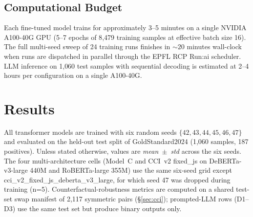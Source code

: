\documentclass[10pt,a4paper]{article}
\newcommand{\dataset}{GoldStandard2024}
\begin{document}
\subsection{Computational Budget}

Each fine-tuned model trains for approximately 3--5 minutes on a single NVIDIA A100-40G GPU (5--7 epochs of 8{,}479 training samples at effective batch size 16). The full multi-seed sweep of 24 training runs finishes in $\sim 20$ minutes wall-clock when runs are dispatched in parallel through the EPFL RCP Run:ai scheduler. LLM inference on 1{,}060 test samples with sequential decoding is estimated at 2--4 hours per configuration on a single A100-40G.


\section{Results}
\label{sec:results}

All transformer models are trained with six random seeds $\{42, 43, 44, 45, 46, 47\}$ and evaluated on the held-out test split of \dataset{} (1{,}060 samples, 187 positives). Unless stated otherwise, values are \emph{mean~$\pm$~std} across the six seeds. The four multi-architecture cells (Model~C and CCI~v2 fixed\_js on DeBERTa-v3-large 440M and RoBERTa-large 355M) use the same six-seed grid except cci\_v2\_fixed\_js\_deberta\_v3\_large, for which seed 47 was dropped during training (n=5). Counterfactual-robustness metrics are computed on a shared test-set swap manifest of 2{,}117 symmetric pairs (\S\ref{sec:cci}); prompted-LLM rows (D1--D3) use the same test set but produce binary outputs only.
\end{document}
